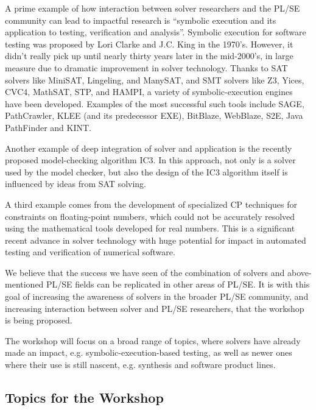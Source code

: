 \documentclass{sig-alternate}
\begin{document}
\vspace{0.2cm} A prime example of how interaction between solver
researchers and the PL/SE community can lead to impactful research is
``symbolic execution and its application to testing, verification and
analysis''. Symbolic execution for software testing was proposed by
Lori Clarke and J.C. King in the 1970's. However, it didn't really
pick up until nearly thirty years later in the mid-2000's, in large
measure due to dramatic improvement in solver technology. Thanks to
SAT solvers like MiniSAT, Lingeling, and ManySAT, and SMT solvers like Z3,
Yices, CVC4, MathSAT, STP, and HAMPI, a variety of symbolic-execution
engines have been developed. Examples of the most successful such
tools include SAGE, PathCrawler, KLEE (and its predecessor EXE),
BitBlaze, WebBlaze, S2E, Java PathFinder and KINT.

\vspace{0.2cm} Another example of deep integration of solver and
application is the recently proposed model-checking algorithm IC3.  In
this approach, not only is a solver used by the model checker, but
also the design of the IC3 algorithm itself is influenced by ideas
from SAT solving.

\vspace{0.2cm} A third example comes from the development of
specialized CP techniques for constraints on floating-point numbers,
which could not be accurately resolved using the mathematical tools
developed for real numbers. This is a significant recent advance in
solver technology with huge potential for impact in automated testing
and verification of numerical software.

\vspace{0.2cm} We believe that the success we have seen of the
combination of solvers and above-mentioned PL/SE fields can be replicated
in other areas of PL/SE. It is with this goal of increasing the awareness
of solvers in the broader PL/SE community, and increasing interaction
between solver and PL/SE researchers, that the workshop is being proposed.

\vspace{0.2cm} The workshop will focus on a broad range of topics,
where solvers have already made an impact, e.g. symbolic-execution-based
testing, as well as newer ones where their use is still nascent,
e.g. synthesis and software product lines.

\subsection*{Topics for the Workshop}
\vspace{0.2cm}
\end{document}
